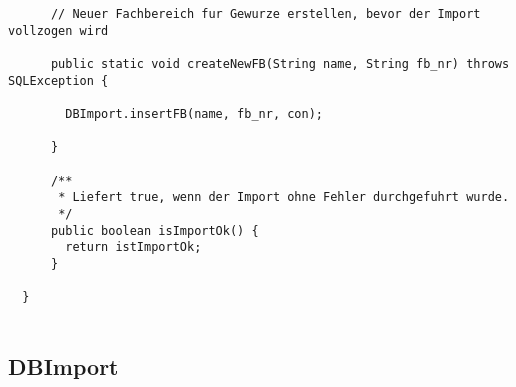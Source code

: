 \begin{lstlisting}
      // Neuer Fachbereich fur Gewurze erstellen, bevor der Import vollzogen wird

      public static void createNewFB(String name, String fb_nr) throws SQLException {

        DBImport.insertFB(name, fb_nr, con);

      }

      /**
       * Liefert true, wenn der Import ohne Fehler durchgefuhrt wurde.
       */
      public boolean isImportOk() {
        return istImportOk;
      }

  }


\end{lstlisting}


\subsection{DBImport}

